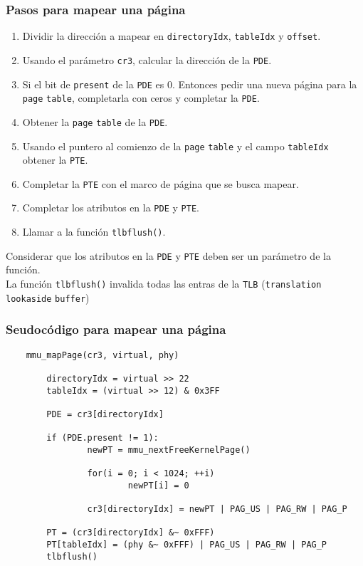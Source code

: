 \documentclass[aspectratio=169]{beamer}
\begin{document}
\begin{frame}
    \frametitle{Pasos para mapear una página}
    \begin{enumerate}
     \item Dividir la dirección a mapear en \texttt{directoryIdx}, \texttt{tableIdx} y \texttt{offset}.
     \pause
     \item Usando el parámetro \texttt{cr3}, calcular la dirección de la \texttt{PDE}.
     \pause
     \item Si el bit de \texttt{present} de la \texttt{PDE} es 0. Entonces pedir una nueva página para la \texttt{page} \texttt{table}, completarla con ceros y completar la \texttt{PDE}.
     \pause
     \item Obtener la \texttt{page} \texttt{table} de la \texttt{PDE}.
     \pause
     \item Usando el puntero al comienzo de la \texttt{page} \texttt{table} y el campo \texttt{tableIdx} obtener la \texttt{PTE}.
     \pause
     \item Completar la \texttt{PTE} con el marco de página que se busca mapear.
     \pause
     \item Completar los atributos en la \texttt{PDE} y \texttt{PTE}.
     \pause
     \item Llamar a la función \texttt{tlbflush()}.
     \pause
    \end{enumerate}
    \vspace{0.3cm}
    \textcolor{verdeuca}{Considerar que los atributos en la \texttt{PDE} y \texttt{PTE} deben ser un parámetro de la función.}\\
    \vspace{0.3cm}
    \pause
    \textcolor{verdeuca}{La función \texttt{tlbflush()} invalida todas las entras de la \texttt{TLB} (\texttt{translation} \texttt{lookaside} \texttt{buffer})}
\end{frame}

\begin{frame}[fragile]
    \frametitle{Seudocódigo para mapear una página}
    \small
    \begin{verbatim}
    mmu_mapPage(cr3, virtual, phy)
    
        directoryIdx = virtual >> 22
        tableIdx = (virtual >> 12) & 0x3FF
        
        PDE = cr3[directoryIdx]

        if (PDE.present != 1):
                newPT = mmu_nextFreeKernelPage()
                
                for(i = 0; i < 1024; ++i)
                        newPT[i] = 0
                        
                cr3[directoryIdx] = newPT | PAG_US | PAG_RW | PAG_P
        
        PT = (cr3[directoryIdx] &~ 0xFFF)
        PT[tableIdx] = (phy &~ 0xFFF) | PAG_US | PAG_RW | PAG_P
        tlbflush()
    \end{verbatim}
\end{frame}
\end{document}
